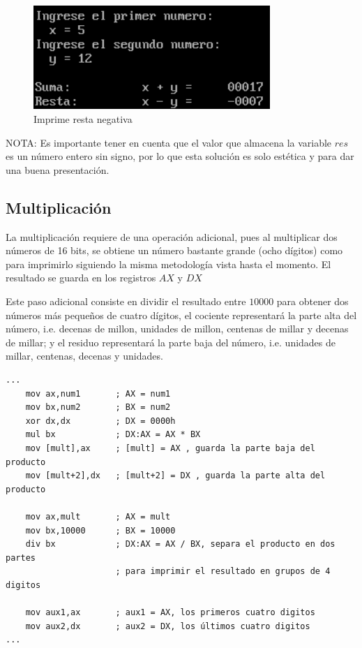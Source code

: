 \documentclass[letter,12 pt,titlepage]{article}
\begin{document}
    \begin{figure}[H]
    \centering
    \includegraphics[width=0.8\textwidth]{img/04.png}
    \caption{Imprime resta negativa}
    \end{figure}

    NOTA: Es importante tener en cuenta que el valor que almacena la variable $res$ es un número entero sin signo, por lo que esta solución es solo estética y para dar una buena presentación.

    \subsection{Multiplicación}

    La multiplicación requiere de una operación adicional, pues al multiplicar dos números de 16 bits, se obtiene un número bastante grande (ocho dígitos) como para imprimirlo siguiendo la misma metodología vista hasta el momento. El resultado se guarda en los registros $AX$ y $DX$

    Este paso adicional consiste en dividir el resultado entre $10000$ para obtener dos números más pequeños de cuatro dígitos, el cociente representará la parte alta del número, i.e. decenas de millon, unidades de millon, centenas de millar y decenas de millar; y el residuo representará la parte baja del número, i.e. unidades de millar, centenas, decenas y unidades.

    \begin{verbatim}
...
    mov ax,num1       ; AX = num1
    mov bx,num2       ; BX = num2
    xor dx,dx         ; DX = 0000h
    mul bx            ; DX:AX = AX * BX
    mov [mult],ax     ; [mult] = AX , guarda la parte baja del producto
    mov [mult+2],dx   ; [mult+2] = DX , guarda la parte alta del producto

    mov ax,mult       ; AX = mult
    mov bx,10000      ; BX = 10000
    div bx            ; DX:AX = AX / BX, separa el producto en dos partes 
                      ; para imprimir el resultado en grupos de 4 digitos

    mov aux1,ax       ; aux1 = AX, los primeros cuatro digitos
    mov aux2,dx       ; aux2 = DX, los últimos cuatro digitos
...
    \end{verbatim}
\end{document}
